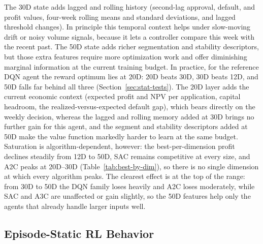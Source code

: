 \documentclass[preprint,review,authoryear,12pt]{elsarticle}
\begin{document}
The 30D state adds lagged and rolling history (second-lag approval, default, and profit
values, four-week rolling means and standard deviations, and lagged threshold changes).
In principle this temporal context helps under slow-moving drift or noisy volume
signals, because it lets a controller compare this week with the recent past. The 50D
state adds
richer segmentation and stability descriptors, but those extra features require more
optimization work and offer diminishing marginal information at the current training
budget. In practice, for the reference DQN agent the reward optimum lies at 20D: 20D
beats 30D, 30D beats 12D, and 50D falls far behind all three
(Section~\ref{sec:stat-tests}). The 20D
layer adds the current economic context (expected profit and NPV per application, capital
headroom, the realized-versus-expected default gap), which bears directly on the weekly
decision, whereas the lagged and rolling memory added at 30D brings no further gain for
this agent, and the segment and stability descriptors added at 50D make the value
function markedly harder to learn at the same budget. Saturation is algorithm-dependent,
however: the best-per-dimension profit declines steadily from 12D to 50D, SAC remains
competitive at every size, and A2C peaks at 20D--30D (Table~\ref{tab:best-by-dim}), so
there is no single dimension at which every algorithm peaks. The clearest effect is at the
top of the range: from 30D to 50D the DQN family loses heavily and A2C loses moderately,
while SAC and A3C are unaffected or gain slightly, so the 50D features help only the
agents that already handle larger inputs well.

\subsection{Episode-Static RL Behavior}
\label{sec:episode-static}
\end{document}
